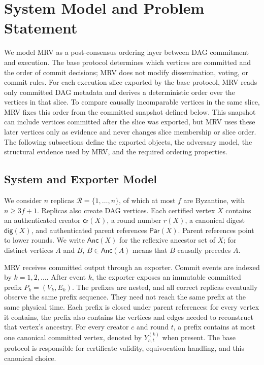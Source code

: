 \section{System Model and Problem Statement}
\label{sec:model}

We model MRV as a post-consensus ordering layer between DAG commitment and execution. The base protocol determines which vertices are committed and the order of commit decisions; MRV does not modify dissemination, voting, or commit rules. For each execution slice exported by the base protocol, MRV reads only committed DAG metadata and derives a deterministic order over the
vertices in that slice. To compare causally incomparable vertices in the same slice, MRV fixes this order from the committed snapshot defined below. This snapshot can include vertices committed after the slice was exported, but MRV uses these later
vertices only as evidence and never changes slice membership or slice order. The following subsections define the exported objects, the adversary model, the structural evidence used by MRV, and the required ordering properties.

\subsection{System and Exporter Model}

We consider $n$ replicas $\mathcal{R}=\{1,\ldots,n\}$, of which at most $f$ are Byzantine, with $n\geq 3f+1$. Replicas also create DAG vertices. Each certified vertex $X$ contains an authenticated creator $\mathsf{cr}(X)$, a round number
$r(X)$, a canonical digest $\mathsf{dig}(X)$, and authenticated parent references $\mathsf{Par}(X)$. Parent references point to lower rounds. We write $\mathsf{Anc}(X)$ for the reflexive ancestor set of $X$; for distinct vertices $A$ and $B$, $B\in\mathsf{Anc}(A)$ means that $B$ causally precedes $A$.

MRV receives committed output through an exporter. Commit events are indexed by $k=1,2,\ldots$. After event $k$, the exporter exposes an immutable committed prefix $P_k=(V_k,E_k)$. The prefixes are nested, and all correct replicas eventually observe the same prefix sequence. They need not reach the same prefix at the same physical time. Each prefix is closed under parent references: for every vertex it contains, the prefix also contains the vertices and edges needed to reconstruct that vertex's ancestry. For every creator $c$ and round $t$, a prefix contains at most one canonical committed vertex, denoted by $Y^{(k)}_{c,t}$ when present. The base protocol is responsible for certificate validity, equivocation handling, and this canonical choice.

